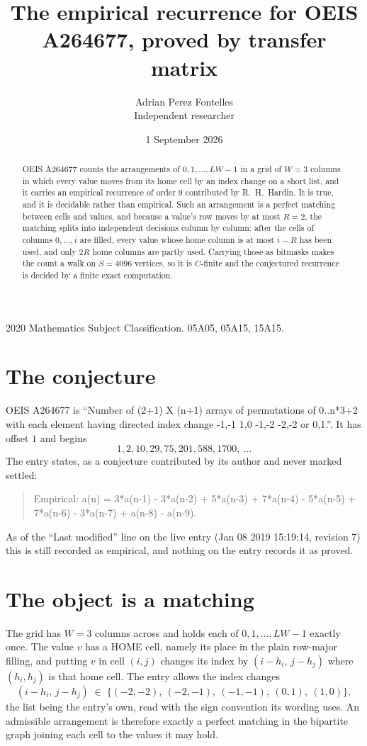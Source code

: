 \documentclass[11pt,a4paper]{article}
\title{The empirical recurrence for OEIS A264677, proved by transfer matrix}
\author{Adrian Perez Fontelles\\ \small Independent researcher}
\date{1 September 2026}
\theoremstyle{plain}
\theoremstyle{definition}
\begin{document}
\maketitle

\begin{abstract}
OEIS A264677 counts the arrangements of $0,1,\dots,LW-1$ in a grid of $W=3$ columns in which
every value moves from its home cell by an index change on a short list, and it carries an
empirical recurrence of order $9$ contributed by R.~H.~Hardin. It is true, and it is
decidable rather than empirical. Such an arrangement is a perfect matching between cells and
values, and because a value's row moves by at most $R=2$, the matching splits into
independent decisions column by column: after the cells of columns $0,\dots,i$ are filled,
every value whose home column is at most $i-R$ has been used, and only $2R$ home columns are
partly used. Carrying those as bitmasks makes the count a walk on $S=4096$ vertices, so it is
$C$-finite and the conjectured recurrence is decided by a finite exact computation.
\end{abstract}

\noindent\small 2020 Mathematics Subject Classification. 05A05, 05A15, 15A15.\normalsize

\section{The conjecture}

OEIS A264677 is ``Number of (2+1) X (n+1) arrays of permutations of 0..n*3+2 with each element having directed index change -1,-1 1,0 -1,-2 -2,-2 or 0,1.''. It has offset $1$ and begins
\[
1, 2, 10, 29, 75, 201, 588, 1700,\ \dots
\]
The entry states, as a conjecture contributed by its author and never marked settled:
\begin{quote}
Empirical: a(n) = 3*a(n-1) - 3*a(n-2) + 5*a(n-3) + 7*a(n-4) - 5*a(n-5) + 7*a(n-6) - 3*a(n-7) + a(n-8) - a(n-9).
\end{quote}
As of the ``Last modified'' line on the live entry (Jan 08 2019 15:19:14, revision 7) this is still
recorded as empirical, and nothing on the entry records it as proved.

\section{The object is a matching}

The grid has $W=3$ columns across and holds each of $0,1,\dots,LW-1$ exactly once. The value
$v$ has a HOME cell, namely its place in the plain row-major filling, and putting $v$ in cell
$(i,j)$ changes its index by $(i-h_i,\,j-h_j)$ where $(h_i,h_j)$ is that home cell. The entry
allows the index changes
\[
(i-h_i,\,j-h_j)\;\in\;\{(-2,-2),\ (-2,-1),\ (-1,-1),\ (0,1),\ (1,0)\},
\]
the list being the entry's own, read with the sign convention its wording uses. An admissible
arrangement is therefore exactly a perfect matching in the bipartite graph joining each cell to
the values it may hold.
\end{document}
